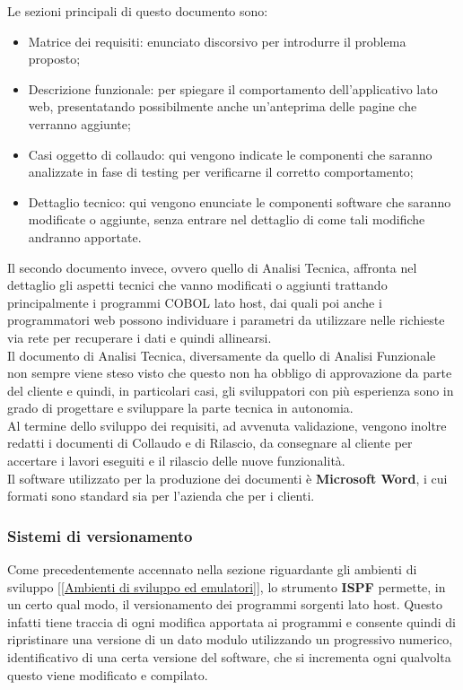	Le sezioni principali di questo documento sono:
\begin{itemize}
	\item Matrice dei requisiti: enunciato discorsivo per introdurre il problema proposto;
	\item Descrizione funzionale: per spiegare il comportamento dell'applicativo lato web, presentatando possibilmente anche un'anteprima delle pagine che verranno aggiunte;
	\item Casi oggetto di collaudo: qui vengono indicate le componenti che saranno analizzate in fase di testing per verificarne il corretto comportamento;
	\item Dettaglio tecnico: qui vengono enunciate le componenti software che saranno modificate o aggiunte, senza entrare nel dettaglio di come tali modifiche andranno apportate.
\end{itemize}

	Il secondo documento invece, ovvero quello di Analisi Tecnica, affronta nel dettaglio gli aspetti tecnici che vanno modificati o aggiunti trattando principalmente i programmi COBOL lato host, dai quali poi anche i programmatori web possono individuare i parametri da utilizzare nelle richieste via rete per recuperare i dati e quindi allinearsi.\\
	
	Il documento di Analisi Tecnica, diversamente da quello di Analisi Funzionale non sempre viene steso visto che questo non ha obbligo di approvazione da parte del cliente e quindi, in particolari casi, gli sviluppatori con più esperienza sono in grado di progettare e sviluppare la parte tecnica in autonomia.\\
	
	Al termine dello sviluppo dei requisiti, ad avvenuta validazione, vengono inoltre redatti i documenti di Collaudo e di Rilascio, da consegnare al cliente per accertare i lavori eseguiti e il rilascio delle nuove funzionalità.\\
			
	Il software utilizzato per la produzione dei documenti è \textbf{Microsoft Word}, i cui formati sono standard sia per l'azienda che per i clienti.
	
	
	\subsubsection{Sistemi di versionamento}

	Come precedentemente accennato nella sezione riguardante gli ambienti di sviluppo [\ref{Ambienti di sviluppo ed emulatori}], lo strumento \textbf{ISPF} permette, in un certo qual modo, il versionamento dei programmi sorgenti lato host. Questo infatti tiene traccia di ogni modifica apportata ai programmi e consente quindi di ripristinare una versione di un dato modulo utilizzando un progressivo numerico, identificativo di una certa versione del software, che si incrementa ogni qualvolta questo viene modificato e compilato.\\
	
